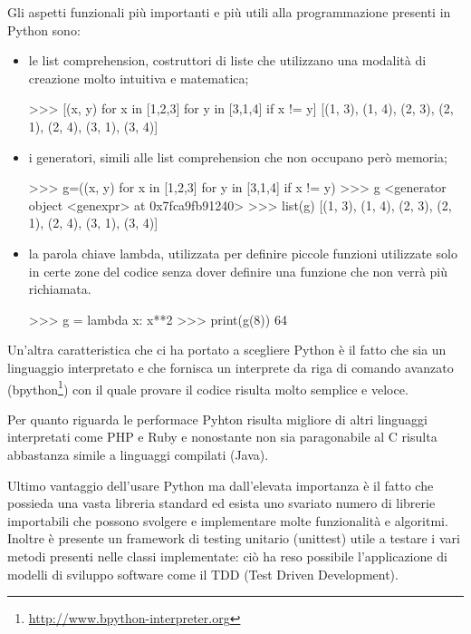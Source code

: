 \documentclass[12pt]{report}
\begin{document}
Gli aspetti funzionali più importanti e più utili alla programmazione presenti in Python sono:
\begin{itemize}
\item le list comprehension, costruttori di liste che utilizzano una modalità di creazione molto intuitiva e matematica;
\begin{python}[title=Esempio di List Comprehension,frame=single]
>>> [(x, y) for x in [1,2,3] for y in [3,1,4] if x != y]
[(1, 3), (1, 4), (2, 3), (2, 1), (2, 4), (3, 1), (3, 4)]
\end{python}

\vspace{5mm} %
\item i generatori, simili alle list comprehension che non occupano però memoria;
\begin{python}[title=Esempio di Generatore, frame=single]
>>> g=((x, y) for x in [1,2,3] for y in [3,1,4] if x != y)
>>> g
<generator object <genexpr> at 0x7fca9fb91240>
>>> list(g)
[(1, 3), (1, 4), (2, 3), (2, 1), (2, 4), (3, 1), (3, 4)]
\end{python}

\vspace{5mm} %
\item la parola chiave lambda, utilizzata per definire piccole funzioni utilizzate solo in certe zone del codice senza dover definire una funzione che non verrà più richiamata.
\begin{python}[title=Esempio di utilizzo della lambda, frame=single]
>>> g = lambda x: x**2
>>> print(g(8))
64
\end{python}

\vspace{5mm} %
\end{itemize}  
 
Un'altra caratteristica che ci ha portato a scegliere Python è il fatto che sia un linguaggio interpretato e che fornisca un interprete da riga di comando avanzato (bpython\footnote{\url{http://www.bpython-interpreter.org}}) con il quale provare il codice risulta molto semplice e veloce. 

Per quanto riguarda le performace Pyhton risulta migliore di altri linguaggi interpretati come PHP e Ruby e nonostante non sia paragonabile al C risulta abbastanza simile a linguaggi compilati (Java).

Ultimo vantaggio dell'usare Python ma dall'elevata importanza è il fatto che possieda una vasta libreria standard ed esista uno svariato numero di librerie importabili che possono svolgere e implementare molte funzionalità e algoritmi. Inoltre è presente un framework di testing unitario (unittest) utile a testare i vari metodi presenti nelle classi implementate: ciò ha reso possibile l'applicazione di modelli di sviluppo software come il TDD (Test Driven Development).
\end{document}
